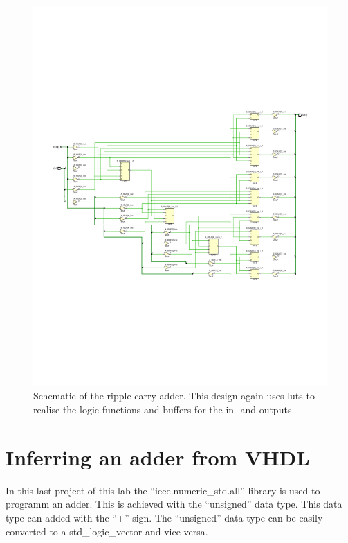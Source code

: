 \begin{figure}[h]
	\centering
	\includegraphics[width=\linewidth, trim=0mm 70mm 0mm 70mm]{./L1/E5/schematic.pdf}
	\caption{Schematic of the ripple-carry adder. This design again uses \glspl{lut} to realise the logic functions and buffers for the in- and outputs.}
	\label{fig: Ripple-carry adder schematic}
\end{figure}



\section{Inferring an adder from VHDL}

In this last project of this lab the ``ieee.numeric\_std.all'' library is used to programm an adder. This is achieved with the ``unsigned'' data type. This data type can added with the ``+'' sign. The ``unsigned'' data type can be easily converted to a std\_logic\_vector and vice versa. 

